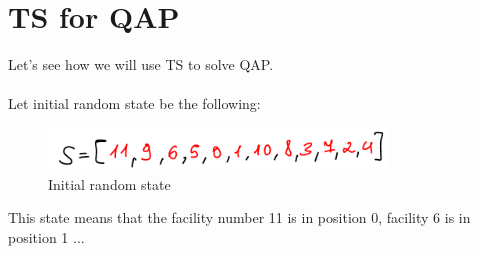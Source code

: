 \documentclass[a4paper]{article}
\begin{document}
\section{TS for QAP}
Let's see how we will use TS to solve QAP.\\\\
Let initial random state be the following:
\begin{figure}[H]
\center
\includegraphics[width=0.8\textwidth]{images/state_image.PNG}
\caption{Initial random state}
\end{figure}
This state means that the facility number 11 is in position 0, facility 6 is in position 1 ... 
\end{document}
